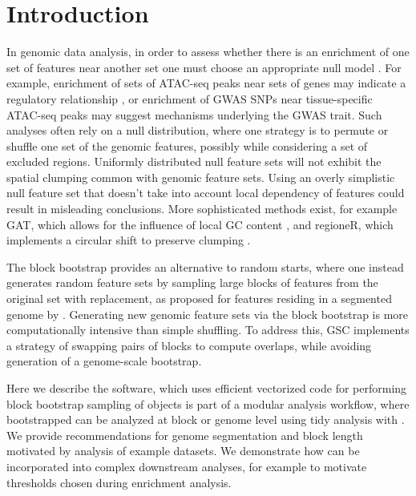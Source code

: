 \section{Introduction}

In genomic data analysis, in order to assess whether
there is an enrichment of one set of features near another set one
must choose an appropriate null model \citep{reviewdilemma2014}.
For example, enrichment of sets of ATAC-seq peaks near sets of genes
may indicate a regulatory relationship \citep{lee2020fluent}, or
enrichment of GWAS SNPs
near tissue-specific ATAC-seq peaks may suggest mechanisms underlying
the GWAS trait.
Such analyses often rely on a null distribution, where one
strategy is to permute or shuffle one set of the
genomic features, possibly while considering a set of excluded
regions.
Uniformly distributed null feature sets will not exhibit the spatial
clumping common with genomic feature sets.
Using an overly simplistic null feature set that doesn't take into
account local dependency of features could result in misleading
conclusions.
More sophisticated methods exist, for example
GAT, which allows for the influence of local GC content
\citep{GAT_2013}, and regioneR, which implements a circular shift to
preserve clumping \citep{gel2016regioner}.

The block bootstrap \citep{politis1999subsampling}
provides an alternative to random starts, where one instead generates
random feature sets by sampling large blocks of features from the
original set with replacement, as proposed for features residing in a
segmented genome by \citet{bickel2010subsampling}.
Generating new genomic feature sets via the block bootstrap is more
computationally intensive than simple shuffling.
To address this, GSC \citep{bickel2010subsampling} implements a
strategy of swapping pairs of blocks to compute overlaps, while
avoiding generation of a genome-scale bootstrap.

Here we describe the \bootranges software, which uses efficient
vectorized code for performing block bootstrap sampling of
\granges \citep{lawrence2013software} objects
\bootranges is part of a modular analysis workflow, where bootstrapped
\granges can be analyzed at block or genome level using tidy
analysis with \plyranges \citep{lee2019plyranges}.
We provide recommendations for genome segmentation and block length
motivated by analysis of example datasets.
We demonstrate how \bootranges can be incorporated into complex
downstream analyses, for example to motivate thresholds chosen during
enrichment analysis.

